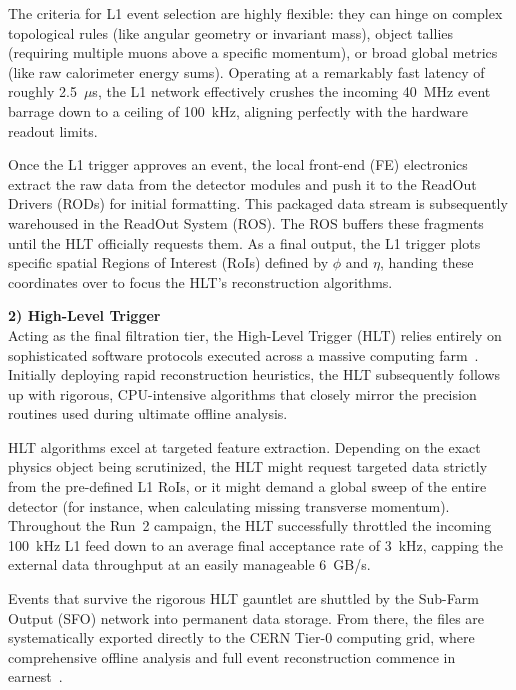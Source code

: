 The criteria for L1 event selection are highly flexible: they can hinge on complex topological rules (like angular geometry or invariant mass), object tallies (requiring multiple muons above a specific momentum), or broad global metrics (like raw calorimeter energy sums). Operating at a remarkably fast latency of roughly 2.5~$\mu$s, the L1 network effectively crushes the incoming 40~MHz event barrage down to a ceiling of 100~kHz, aligning perfectly with the hardware readout limits.

Once the L1 trigger approves an event, the local front-end (FE) electronics extract the raw data from the detector modules and push it to the ReadOut Drivers (RODs) for initial formatting. This packaged data stream is subsequently warehoused in the ReadOut System (ROS). The ROS buffers these fragments until the HLT officially requests them. As a final output, the L1 trigger plots specific spatial Regions of Interest (RoIs) defined by $\phi$ and $\eta$, handing these coordinates over to focus the HLT's reconstruction algorithms.

\noindent\textbf{2) High-Level Trigger} \\ 
Acting as the final filtration tier, the High-Level Trigger (HLT) relies entirely on sophisticated software protocols executed across a massive computing farm~\cite{ATLAS-TDR-16}. Initially deploying rapid reconstruction heuristics, the HLT subsequently follows up with rigorous, CPU-intensive algorithms that closely mirror the precision routines used during ultimate offline analysis.

HLT algorithms excel at targeted feature extraction. Depending on the exact physics object being scrutinized, the HLT might request targeted data strictly from the pre-defined L1 RoIs, or it might demand a global sweep of the entire detector (for instance, when calculating missing transverse momentum). Throughout the Run~2 campaign, the HLT successfully throttled the incoming 100~kHz L1 feed down to an average final acceptance rate of 3~kHz, capping the external data throughput at an easily manageable 6~GB/s.

Events that survive the rigorous HLT gauntlet are shuttled by the Sub-Farm Output (SFO) network into permanent data storage. From there, the files are systematically exported directly to the CERN Tier-0 computing grid, where comprehensive offline analysis and full event reconstruction commence in earnest~\cite{ATLAS-TDR-17}.

